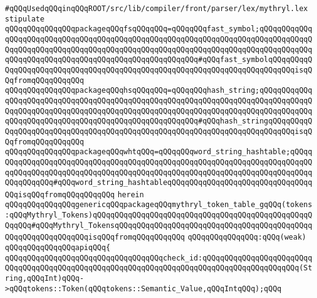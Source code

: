 \verb|#qQQqUsedqQQqinqQQqROOT/src/lib/compiler/front/parser/lex/mythryl.lex|\newline
\newline
\verb|stipulate|\newline
\verb|qQQqqQQqqQQqqQQqpackageqQQqfsqQQqqQQq=qQQqqQQqfast_symbol;qQQqqQQqqQQqqQQqqQQqqQQqqQQqqQQqqQQqqQQqqQQqqQQqqQQqqQQqqQQqqQQqqQQqqQQqqQQqqQQqqQQqqQQqqQQqqQQqqQQqqQQqqQQqqQQqqQQqqQQqqQQqqQQqqQQqqQQqqQQqqQQqqQQqqQQqqQQqqQQqqQQqqQQqqQQqqQQqqQQqqQQqqQQqqQQqqQQq#qQQqfast_symbolqQQqqQQqqQQqqQQqqQQqqQQqqQQqqQQqqQQqqQQqqQQqqQQqqQQqqQQqqQQqqQQqqQQqqQQqqQQqisqQQqfromqQQqqQQqqQQq|\newline
\verb|qQQqqQQqqQQqqQQqpackageqQQqhsqQQqqQQq=qQQqqQQqhash_string;qQQqqQQqqQQqqQQqqQQqqQQqqQQqqQQqqQQqqQQqqQQqqQQqqQQqqQQqqQQqqQQqqQQqqQQqqQQqqQQqqQQqqQQqqQQqqQQqqQQqqQQqqQQqqQQqqQQqqQQqqQQqqQQqqQQqqQQqqQQqqQQqqQQqqQQqqQQqqQQqqQQqqQQqqQQqqQQqqQQqqQQqqQQqqQQqqQQq#qQQqhash_stringqQQqqQQqqQQqqQQqqQQqqQQqqQQqqQQqqQQqqQQqqQQqqQQqqQQqqQQqqQQqqQQqqQQqqQQqqQQqisqQQqfromqQQqqQQqqQQq|\newline
\verb|qQQqqQQqqQQqqQQqpackageqQQqwhtqQQq=qQQqqQQqword_string_hashtable;qQQqqQQqqQQqqQQqqQQqqQQqqQQqqQQqqQQqqQQqqQQqqQQqqQQqqQQqqQQqqQQqqQQqqQQqqQQqqQQqqQQqqQQqqQQqqQQqqQQqqQQqqQQqqQQqqQQqqQQqqQQqqQQqqQQqqQQqqQQqqQQqqQQqqQQqqQQq#qQQqword_string_hashtableqQQqqQQqqQQqqQQqqQQqqQQqqQQqqQQqqQQqisqQQqfromqQQqqQQqqQQq|\newline
\verb|herein|\newline
\newline
\verb|qQQqqQQqqQQqqQQqgenericqQQqpackageqQQqmythryl_token_table_gqQQq(tokens:qQQqMythryl_Tokens)qQQqqQQqqQQqqQQqqQQqqQQqqQQqqQQqqQQqqQQqqQQqqQQqqQQqqQQq#qQQqMythryl_TokensqQQqqQQqqQQqqQQqqQQqqQQqqQQqqQQqqQQqqQQqqQQqqQQqqQQqqQQqqQQqqQQqisqQQqfromqQQqqQQqqQQq|\newline
\verb|qQQqqQQqqQQqqQQq:qQQq(weak)|\newline
\verb|qQQqqQQqqQQqqQQqapiqQQq{|\newline
\verb|qQQqqQQqqQQqqQQqqQQqqQQqqQQqqQQqqQQqcheck_id:qQQqqQQqqQQqqQQqqQQqqQQqqQQqqQQqqQQqqQQqqQQqqQQqqQQqqQQqqQQqqQQqqQQqqQQqqQQqqQQqqQQqqQQqqQQq(String,qQQqInt)qQQq->qQQqtokens::Token(qQQqtokens::Semantic_Value,qQQqIntqQQq);qQQq|\newline
